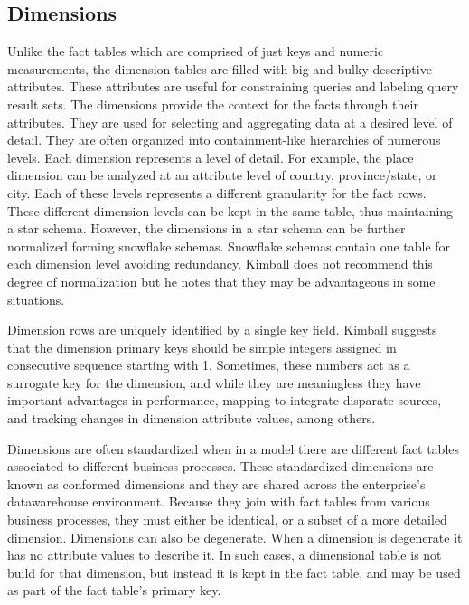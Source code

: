 \documentclass[]{article}
\begin{document}

\subsection{Dimensions} %
\label{sub:dimensions}

Unlike the fact tables which are comprised of just keys and numeric measurements, the dimension tables are filled with big and bulky descriptive attributes.
These attributes are useful for constraining queries and labeling query result sets. The dimensions provide the context for the facts through their attributes.
They are used for selecting and aggregating data at a desired level of detail. They are often organized into containment-like hierarchies of numerous levels.
Each dimension represents a level of detail. For example, the place dimension can be analyzed at an attribute level of country, province/state, or city. Each of
these levels represents a different granularity for the fact rows. These different dimension levels can be kept in the same table, thus maintaining a star
schema. However, the dimensions in a star schema can be further normalized forming snowflake schemas. Snowflake schemas contain one table for each dimension
level avoiding redundancy. Kimball does not recommend this degree of normalization but he notes that they may be advantageous in some situations.

Dimension rows are uniquely identified by a single key field. Kimball suggests that the dimension primary keys should be simple integers assigned in consecutive
sequence starting with 1. Sometimes, these numbers act as a surrogate key for the dimension, and while they are meaningless they have important advantages in
performance, mapping to integrate disparate sources, and tracking changes in dimension attribute values, among others.

Dimensions are often standardized when in a model there are different fact tables associated to different business processes. These standardized dimensions are
known as conformed dimensions and they are shared across the enterprise's datawarehouse environment. Because they join with fact tables from various business
processes, they must either be identical, or a subset of a more detailed dimension. Dimensions can also be degenerate. When a dimension is degenerate it has no
attribute values to describe it. In such cases, a dimensional table is not build for that dimension, but instead it is kept in the fact table, and may be used as
part of the fact table's primary key.
\end{document}
